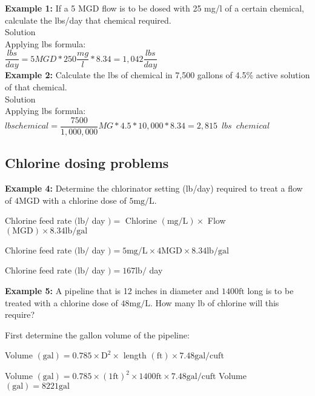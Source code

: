 \textbf{Example 1:} If a 5 MGD flow is to be dosed with 25 mg/l of a certain chemical, calculate the lbs/day that chemical required.\\

Solution\\

Applying lbs formula:\\
$\dfrac{lbs}{day}=5 MGD *250\dfrac{mg}{l}*8.34 = \boxed{1,042\dfrac{lbs}{day}}$
\\
\vspace{6pt}
\textbf{Example 2:} Calculate the lbs of chemical in 7,500 gallons of 4.5\% active solution of that chemical.\\
Solution\\
Applying lbs formula:\\
$lbs chemical = \dfrac{7500}{1,000,000}MG * 4.5*10,000 *8.34 = \boxed{2,815 \enspace lbs \enspace chemical}$\\

\subsection{Chlorine dosing problems}
\textbf{Example 4:} Determine the chlorinator setting (lb/day) required to treat a flow of $4 \mathrm{MGD}$ with a chlorine dose of $5 \mathrm{mg} / \mathrm{L}$.

Chlorine feed rate $(\mathrm{lb} /$ day $)=$ Chlorine $(\mathrm{mg} / \mathrm{L}) \times$ Flow $(\mathrm{MGD}) \times 8.34 \mathrm{lb} / \mathrm{gal}$

Chlorine feed rate $(\mathrm{lb} /$ day $)=5 \mathrm{mg} / \mathrm{L} \times 4 \mathrm{MGD} \times 8.34 \mathrm{lb} / \mathrm{gal}$

Chlorine feed rate $(\mathrm{lb} /$ day $)=167 \mathrm{lb} /$ day

\textbf{Example 5:} A pipeline that is 12 inches in diameter and $1400 \mathrm{ft}$ long is to be treated with a chlorine dose of $48 \mathrm{mg} / \mathrm{L}$. How many lb of chlorine will this require?

First determine the gallon volume of the pipeline:

Volume $(\mathrm{gal})=0.785 \times \mathrm{D}^{2} \times$ length $(\mathrm{ft}) \times 7.48 \mathrm{gal} / \mathrm{cu} \mathrm{ft}$

Volume $(\mathrm{gal})=0.785 \times(1 \mathrm{ft})^{2} \times 1400 \mathrm{ft} \times 7.48 \mathrm{gal} / \mathrm{cu} \mathrm{ft}$ Volume $(\mathrm{gal})=8221 \mathrm{gal}$

